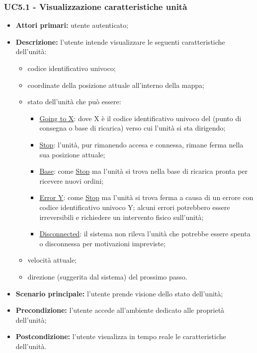         \subsubsection{UC5.1 - Visualizzazione caratteristiche unità}
        \begin{itemize}
            \item \textbf{Attori primari:} utente autenticato;
            \item \textbf{Descrizione:} l'utente intende visualizzare le seguenti caratteristiche dell'unità:
            \begin{itemize}
                \item codice identificativo univoco;
                \item coordinate della posizione attuale all'interno della mappa;
                \item stato dell'unità che può essere:
                \begin{itemize}
                    \item \underline{Going to X}: dove X è il codice identificativo univoco del  (punto di consegna o base di ricarica) verso cui l'unità si sta dirigendo;
                    \item \underline{Stop}: l'unità, pur rimanendo accesa e connessa, rimane ferma nella sua posizione attuale;
                    \item \underline{Base}: come \underline{Stop} ma l'unità si trova nella base di ricarica pronta per ricevere nuovi ordini;
                    \item \underline{Error Y}: come \underline{Stop} ma l'unità si trova ferma a causa di un errore con codice identificativo univoco Y; alcuni errori potrebbero essere irreversibili e richiedere un intervento fisico sull'unità;
                    \item \underline{Disconnected}: il sistema non rileva l'unità che potrebbe essere spenta o disconnessa per motivazioni impreviste;
                \end{itemize}
                \item velocità attuale;
                \item direzione (suggerita dal sistema) del prossimo passo.
            \end{itemize}
            \item \textbf{Scenario principale:} l'utente prende visione dello stato dell'unità;
            \item \textbf{Precondizione:} l'utente accede all'ambiente dedicato alle proprietà dell'unità;
            \item \textbf{Postcondizione:} l'utente visualizza in tempo reale le caratteristiche dell'unità.
        \end{itemize}

